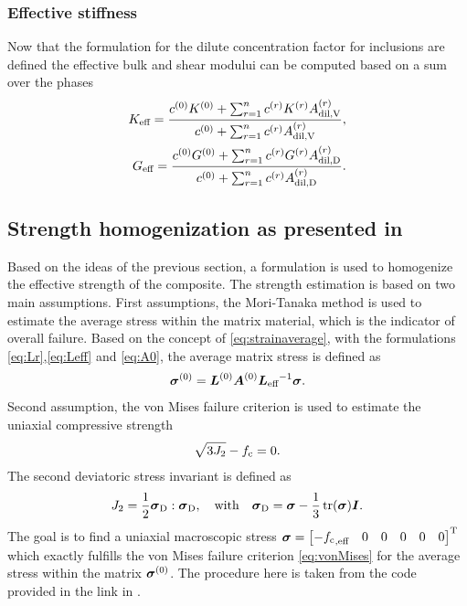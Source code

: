 \subsubsection{Effective stiffness}
Now that the formulation for the dilute concentration factor for inclusions are defined the effective bulk and shear modului can be computed based on a sum over the phases
\begin{align}
K_{\text{eff}} = \dfrac{c^{(0)}K^{(0)} + \sum^{n}_{r=1} c^{(r)} K^{(r)} A^{(r)}_{\text{dil,V}}}{c^{(0)} + \sum^{n}_{r=1} c^{(r)} A^{(r)}_{\text{dil,V}}},\label{eq:keff} \\
G_{\text{eff}} = \dfrac{c^{(0)}G^{(0)} + \sum^{n}_{r=1} c^{(r)} G^{(r)} A^{(r)}_{\text{dil,D}}}{c^{(0)} + \sum^{n}_{r=1} c^{(r)} A^{(r)}_{\text{dil,D}}}.\label{eq:geff}
\end{align}
\subsection{Strength homogenization as presented in \cite{nev_2018_mcam}}
Based on the ideas of the previous section, a formulation is used to homogenize the effective strength of the composite.
The strength estimation is based on two main assumptions.
First assumptions, the Mori-Tanaka method is used to estimate the average stress within the matrix material, which is the indicator of overall failure.
Based on the concept of \eqref{eq:strainaverage}, with the formulations \eqref{eq:Lr},\eqref{eq:Leff} and \eqref{eq:A0}, the average matrix stress is defined as 
\begin{align}
	\boldsymbol{\sigma}^{(0)} = \boldsymbol{L}^{(0)}\boldsymbol{A}^{(0)} {\boldsymbol{L}_{\text{eff}}}^{-1}\boldsymbol{\sigma}. \label{eq:matrixstress}
\end{align}
Second assumption, the von Mises failure criterion is used to estimate the uniaxial compressive strength
\begin{align}
	\sqrt{3 J_2} - {f_{\text{c}}} = 0. \label{eq:vonMises}
\end{align}
The second deviatoric stress invariant is defined as
\begin{align}
	J_2 = \frac{1}{2} \boldsymbol{\sigma}_{\text{D}}:\boldsymbol{\sigma}_{\text{D}},\quad\text{with}\quad
	\boldsymbol{\sigma}_{\text{D}} = \boldsymbol{\sigma} - \frac{1}{3}\operatorname{tr}(\boldsymbol{\sigma})\boldsymbol{I}.
\end{align}
The goal is to find a uniaxial macroscopic stress $\boldsymbol{\sigma} = \begin{bmatrix} -{f_{\text{c}}}_{,\text{eff}} & 0 & 0 &0&0&0 \end{bmatrix}^\text{T}$ which exactly fulfills the von Mises failure criterion \eqref{eq:vonMises} for the average stress within the matrix $\boldsymbol{\sigma}^{(0)}$.
The procedure here is taken from the code provided in the link in \cite{nee_2012_ammf}.


